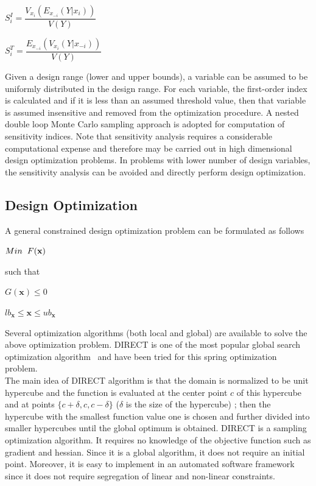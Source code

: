 \documentclass[10pt]{article}
\begin{document}
\centerline{$S_{i}^{I} = \dfrac{V_{x_i}(E_{x_{-i}}(Y|x_{i}))}{V(Y)}$}
\centerline{$S_{i}^{T} = \dfrac{E_{x_{-i}}(V_{x_{i}}(Y|x_{-i}))}{V(Y)}$}

Given a design range (lower and upper bounds), a variable can be assumed to be uniformly distributed in the design range. For each variable, the first-order index is calculated and if it is less than an assumed threshold value, then that variable is assumed insensitive and removed from the optimization procedure. A nested double loop Monte Carlo sampling approach is adopted for computation of sensitivity indices. Note that sensitivity analysis requires a considerable computational expense and therefore may be carried out in high dimensional design optimization problems. In problems with lower number of design variables, the sensitivity analysis can be avoided and directly perform design optimization. 

\subsection{Design Optimization}
\label{subsec:Optimization}
\hspace{5 mm} A general constrained design optimization problem can be formulated as follows

\centerline{$Min \hspace{2 mm} F(\textbf{x})$}
such that

\centerline{$G(\textbf{x}) \leq 0$}
\centerline{$lb_{\textbf{x}} \leq \textbf{x} \leq ub_{\textbf{x}}$}

\noindent  Several optimization algorithms (both local and global) are available to solve the above optimization problem. DIRECT is one of the most popular global search optimization algorithm~\cite{DirectUserGuide} and\cite{DirectPaper} have been tried for this spring optimization problem.\\

The main idea of DIRECT algorithm is that  the domain is normalized to be unit hypercube and the function is evaluated at the center point $c$ of this hypercube and at points $\{c + \delta, c, c - \delta\} $ ($\delta$ is the size of the hypercube) ; then the hypercube with the smallest function value one is chosen and further divided into smaller hypercubes until the global optimum is obtained. DIRECT is a sampling optimization algorithm. It requires no knowledge of the objective function such as gradient and hessian. Since it is a global algorithm, it does not require an initial point.  Moreover, it is easy to implement in an automated software framework since it does not require segregation of linear and non-linear constraints.
\end{document}
